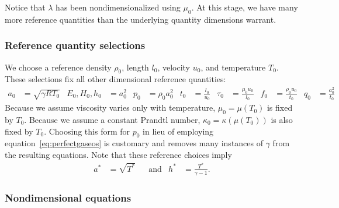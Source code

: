 \documentclass[letterpaper,11pt,nointlimits,reqno]{amsart}
\begin{document}
Notice that $\lambda$ has been nondimensionalized using $\mu_{0}$.  At this
stage, we have many more reference quantities than the underlying quantity
dimensions warrant.

\subsubsection{Reference quantity selections}
\label{sec:nondimrefq}

We choose a reference density $\rho_{0}$, length $l_{0}$, velocity $u_{0}$, and
temperature $T_{0}$.  These selections fix all other dimensional reference
quantities:
\begin{align}
  a_{0} &= \sqrt{\gamma{}RT_{0}}
  &
  E_{0}, H_{0}, h_{0} &= a_{0}^{2}
  &
  p_{0} &= \rho_{0} a_{0}^{2}
  &
  t_{0} &= \frac{l_{0}}{u_{0}}
  &
  \tau_{0} &= \frac{\mu_{0}u_{0}}{l_{0}}
  &
  f_{0} &= \frac{\rho_{0}u_{0}}{t_{0}}
  &
  q_{0} &= \frac{a_{0}^{2}}{t_{0}}
\end{align}
Because we assume viscosity varies only with temperature, $\mu_{0}=\mu\!\left(
T_{0} \right)$ is fixed by $T_{0}$.  Because we assume a constant Prandtl
number, $\kappa_{0}=\kappa\!\left( \mu\!\left( T_{0} \right) \right)$ is also
fixed by $T_{0}$.  Choosing this form for $p_{0}$ in lieu of employing
equation~\eqref{eq:perfectgaseos} is customary and removes many instances of
$\gamma$ from the resulting equations.  Note that these reference choices imply
\begin{align}
a^{*}&=\sqrt{T^{*}}
&
&\text{and}
&
h^{*}&=\frac{T^{*}}{\gamma-1}
.
\end{align}

\subsubsection{Nondimensional equations}
\label{nondim_equations}
\end{document}
